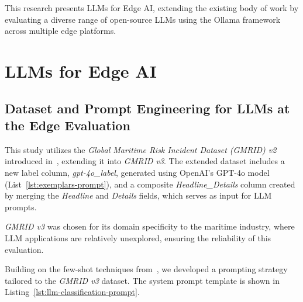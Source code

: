 \documentclass[conference]{IEEEtran}
\begin{document}

This research presents LLMs for Edge AI, extending the existing body of work by evaluating a diverse range of open-source LLMs using the Ollama framework across multiple edge platforms.

\section{LLMs for Edge AI}

\subsection{Dataset and Prompt Engineering for LLMs at the Edge Evaluation}

This study utilizes the \textit{Global Maritime Risk Incident Dataset (GMRID) v2} introduced in~\cite{huang2024automating}, extending it into \textit{GMRID v3}. The extended dataset includes a new label column, \textit{gpt-4o\_label}, generated using OpenAI's GPT-4o model (List~\ref{lst:exemplars-prompt}), and a composite \textit{Headline\_Details} column created by merging the \textit{Headline} and \textit{Details} fields, which serves as input for LLM prompts.

\textit{GMRID v3} was chosen for its domain specificity to the maritime industry, where LLM applications are relatively unexplored, ensuring the reliability of this evaluation.

Building on the few-shot techniques from~\cite{huang2024automating}, we developed a prompting strategy tailored to the \textit{GMRID v3} dataset. The system prompt template is shown in Listing~\ref{lst:llm-classification-prompt}.
\end{document}
